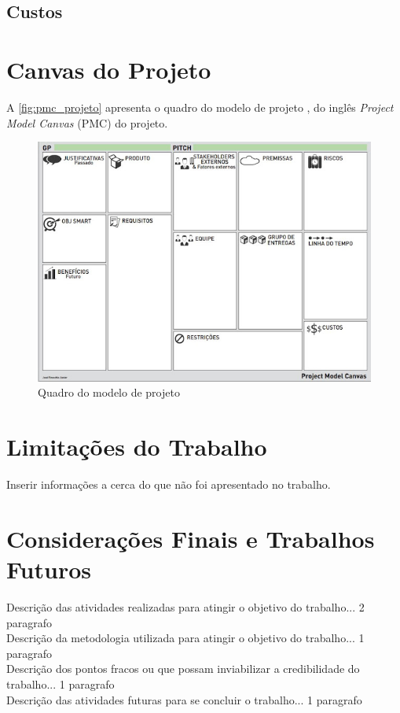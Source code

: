 \documentclass[12pt]{article}
\begin{document}
\subsection{Custos}


\section{Canvas do Projeto} 
\label{sec:pmc_projeto}

A \autoref{fig:pmc_projeto} apresenta o quadro do modelo de projeto \cite{finocchio2013project}, do inglês \textit{Project Model Canvas} (PMC) do projeto.

\begin{figure}[H]
\caption{Quadro do modelo de projeto}
\label{fig:pmc_projeto}
\centering
\includegraphics[width=12cm]{images/project_model_canva.jpg}
\end{figure}



\section{Limitações do Trabalho} \label{sec:ameacas}

Inserir informações a cerca do que não foi apresentado no trabalho.



\section{Considerações Finais e Trabalhos Futuros} \label{sec:consideracoes}
Descrição das atividades realizadas para atingir o objetivo do trabalho... 2 paragrafo\\
Descrição da metodologia utilizada para atingir o objetivo do trabalho... 1 paragrafo\\
Descrição dos pontos fracos ou que possam inviabilizar a credibilidade do trabalho... 1 paragrafo\\
Descrição das atividades futuras para se concluir o trabalho... 1 paragrafo\\
\end{document}
